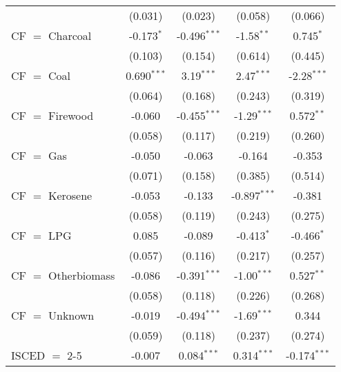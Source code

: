 \begin{table}[htbp!]
\begin{adjustbox}{width = 1\textwidth, max height = 0.95\textheight, center}
\begin{threeparttable}[b]
\begin{tabular}{lcccc}
                                 & (0.031)            & (0.023)            & (0.058)        & (0.066)\\   
            CF $=$ Charcoal      & -0.173$^{*}$       & -0.496$^{***}$     & -1.58$^{**}$   & 0.745$^{*}$\\   
                                 & (0.103)            & (0.154)            & (0.614)        & (0.445)\\   
            CF $=$ Coal          & 0.690$^{***}$      & 3.19$^{***}$       & 2.47$^{***}$   & -2.28$^{***}$\\   
                                 & (0.064)            & (0.168)            & (0.243)        & (0.319)\\   
            CF $=$ Firewood      & -0.060             & -0.455$^{***}$     & -1.29$^{***}$  & 0.572$^{**}$\\   
                                 & (0.058)            & (0.117)            & (0.219)        & (0.260)\\   
            CF $=$ Gas           & -0.050             & -0.063             & -0.164         & -0.353\\   
                                 & (0.071)            & (0.158)            & (0.385)        & (0.514)\\   
            CF $=$ Kerosene      & -0.053             & -0.133             & -0.897$^{***}$ & -0.381\\   
                                 & (0.058)            & (0.119)            & (0.243)        & (0.275)\\   
            CF $=$ LPG           & 0.085              & -0.089             & -0.413$^{*}$   & -0.466$^{*}$\\   
                                 & (0.057)            & (0.116)            & (0.217)        & (0.257)\\   
            CF $=$ Otherbiomass  & -0.086             & -0.391$^{***}$     & -1.00$^{***}$  & 0.527$^{**}$\\   
                                 & (0.058)            & (0.118)            & (0.226)        & (0.268)\\   
            CF $=$ Unknown       & -0.019             & -0.494$^{***}$     & -1.69$^{***}$  & 0.344\\   
                                 & (0.059)            & (0.118)            & (0.237)        & (0.274)\\   
            ISCED $=$ 2-5        & -0.007             & 0.084$^{***}$      & 0.314$^{***}$  & -0.174$^{***}$\\   

\end{tabular}
\end{threeparttable}
\end{adjustbox}
\end{table}

